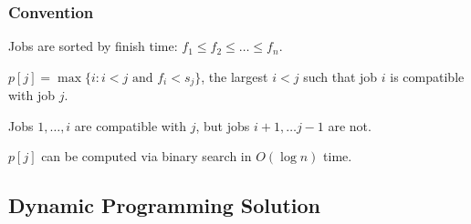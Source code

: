 \subsubsection{Convention}

\begin{listu}
    \item Jobs are sorted by finish time: $f_1 \leq f_2 \leq \ldots \leq f_n$.
    \item $p[j] = \max\{i: i < j \text{ and } f_i < s_j\}$, the largest $i < j$ such that job $i$ is compatible with job $j$.
    \begin{listu}
        \item Jobs $1, \dots, i$ are compatible with $j$, but jobs $i + 1, \dots j - 1$ are not.
        \item $p[j]$ can be computed via binary search in $O(\log n)$ time.
    \end{listu}
\end{listu}

\subsection{Dynamic Programming Solution}

